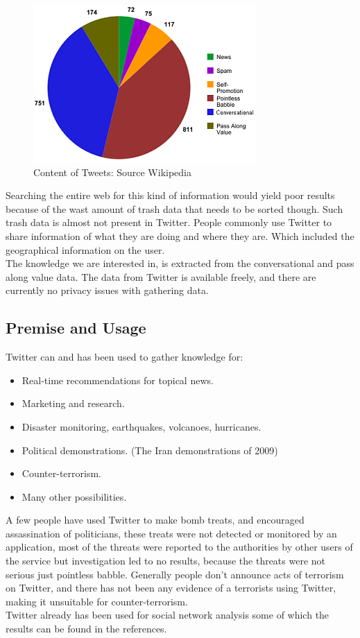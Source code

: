 \documentclass[]{article}  %
\begin{document}
\begin{figure}[h]
\centering
\includegraphics[scale=1]{Content_of_Tweets_Graphed.png}
\caption{Content of Tweets: Source Wikipedia}
\label{figContent}
\end{figure}
 

Searching the entire web for this kind of information would yield poor results because of the wast amount of trash data that needs to be sorted though. Such trash data is almost not present in Twitter. People commonly use Twitter to share information of what they are doing and where they are. Which included the geographical information on the user.\\ The knowledge we are interested in, is extracted from the conversational and pass along value data. The data from Twitter is available freely, and there are currently no privacy issues with gathering data.

\subsection{Premise and Usage}
Twitter can and has been used to gather knowledge for:

\begin{itemize}
	\item Real-time recommendations for topical news. \cite{bib5}
	\item Marketing and research.
	\item Disaster monitoring, earthquakes, volcanoes, hurricanes. \cite{bib7}
	\item Political demonstrations. (The Iran demonstrations of 2009)
	\item Counter-terrorism.
	\item Many other possibilities.
\end{itemize}

A few people have used Twitter to make bomb treats, and encouraged assassination of politicians, these treats were not detected or monitored by an application, most of the threats were reported to the authorities by other users of the service but investigation  led to no results, because the threats were not serious just pointless babble. Generally people don't announce acts of terrorism on Twitter, and there has not been any evidence of a terrorists using Twitter, making it unsuitable for counter-terrorism. \\ Twitter already has been used for social network analysis some of which the results can be found in the references.
\end{document}
